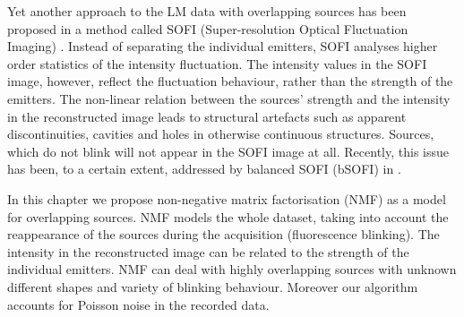 Yet another approach to the LM data with overlapping sources has been proposed in a method called SOFI (Super-resolution Optical Fluctuation Imaging) \cite{Dertinger2010b}. Instead of separating the individual emitters, SOFI analyses higher order statistics of the intensity fluctuation. The intensity values in the SOFI image, however, reflect the fluctuation behaviour, rather than the strength of the emitters. The non-linear relation between the sources' strength and the intensity in the reconstructed image leads to structural artefacts such as apparent discontinuities, cavities and holes in otherwise continuous structures. Sources, which do not blink will not appear in the SOFI image at all. Recently, this issue has been, to a certain extent, addressed by balanced SOFI (bSOFI) in \cite{Geissbuehler2012}.

In this chapter we propose non-negative matrix factorisation (NMF) as a model for overlapping sources. NMF models the whole dataset, taking into account the reappearance of the sources during the acquisition (fluorescence blinking). The intensity in the reconstructed image can be related to the strength of the individual emitters. NMF can deal with highly  overlapping sources with unknown different shapes and variety of blinking behaviour. Moreover our algorithm accounts for Poisson noise in the recorded data. 


\clearpage
